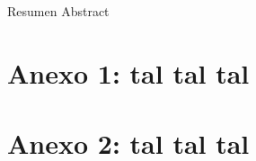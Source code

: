 \documentclass[12pt,twoside,openany]{article}     %
\begin{document}
\newpage
Resumen
\newpage
Abstract
\newpage

\tableofcontents
\newpage

\newpage


































\newpage



\newpage

\appendix
\renewcommand{\appendixname}{Anexos}
\renewcommand{\appendixtocname}{Anexos}
\renewcommand{\appendixpagename}{Anexos}
\addappheadtotoc
\appendixpage
\section{Anexo 1: tal tal tal}\label{aped.A}


\section{Anexo 2: tal tal tal}\label{aped.B}

\end{document}
